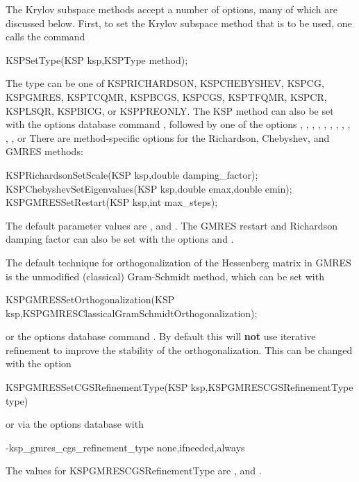 The Krylov subspace methods accept a number of options, many of which
are discussed below.  First, to set the Krylov subspace method that is to
be used, one calls the command
\begin{tabbing}
  KSPSetType(KSP ksp,KSPType method);
\end{tabbing}
The type can be one of KSPRICHARDSON, KSPCHEBYSHEV, KSPCG, KSPGMRES,
KSPTCQMR, KSPBCGS, KSPCGS, KSPTFQMR, KSPCR, KSPLSQR, KSPBICG, or KSPPREONLY.
The KSP method can also be set with the options database command
,
followed by one of the options , , , , ,
, , , , , , or  
There are method-specific options for the Richardson, Chebyshev,
and GMRES methods:  
\begin{tabbing}
  KSPRichardsonSetScale(KSP ksp,double damping\_factor);\\
  KSPChebyshevSetEigenvalues(KSP ksp,double emax,double emin);\\
  KSPGMRESSetRestart(KSP ksp,int max\_steps);
\end{tabbing}
The default parameter values are , and . The GMRES
 restart and Richardson damping factor
can also be set with the options 
and . 

The default technique for orthogonalization of the Hessenberg
matrix in GMRES is
the
unmodified (classical) Gram-Schmidt method, which can be set 
with
\begin{tabbing}
  KSPGMRESSetOrthogonalization(KSP ksp,KSPGMRESClassicalGramSchmidtOrthogonalization);
\end{tabbing}
or the options database 
command .
By default this will {\bf not} use iterative refinement to improve the
stability of the orthogonalization.
This can be changed with the option
\begin{tabbing}
KSPGMRESSetCGSRefinementType(KSP ksp,KSPGMRESCGSRefinementType type)
\end{tabbing}
or via the options database with
\begin{tabbing}
-ksp\_gmres\_cgs\_refinement\_type none,ifneeded,always
\end{tabbing}
The values for KSPGMRESCGSRefinementType are , 
 and .
 

